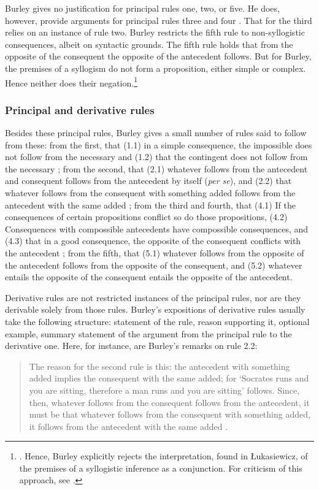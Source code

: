 \documentclass[]{birkjour}
\begin{document}
Burley gives no justification for principal rules one, two, or five. He does, however, provide arguments for principal rules three and four \autocite[p. 63.1-14]{BurleyDPAL}. That for the third relies on an instance of rule two. Burley restricts the fifth rule to non-syllogistic consequences, albeit on syntactic grounds. The fifth rule holds that from the opposite of the consequent the opposite of the antecedent follows. But for Burley, the premises of a syllogism do not form a proposition, either simple or complex. Hence neither does their negation.\footnote{\autocite[pp. 65.3-17; 207.31-208.9]{BurleyDPAL}. Hence, Burley explicitly rejects the interpretation, found in \L{}ukasiewicz, of the premises of a syllogistic inference as a conjunction\autocite{Lukasiewicz1957}. For criticism of this approach, see \autocite{Corcoran1974}.}

\subsubsection{Principal and derivative rules}
Besides these principal rules, Burley gives a small number of rules said to follow from these: from the first, that (1.1) in a simple consequence, the impossible does not follow from the necessary and (1.2) that the contingent does not follow from the necessary \autocite[p. 62.1-8]{BurleyDPAL}; from the second, that (2.1) whatever follows from the antecedent and consequent follows from the antecedent by itself (\textit{per se}), and (2.2) that whatever follows from the consequent with something added follows from the antecedent with the same added \autocite[p. 62.22-38]{BurleyDPAL}; from the third and fourth, that (4.1) If the consequences of certain propositions conflict so do those propositions, (4.2) Consequences with compossible antecedents have compossible consequences, and (4.3) that in a good consequence, the opposite of the consequent conflicts with the antecedent \autocite[pp. 63.15-64.7]{BurleyDPAL}; from the fifth, that (5.1) whatever follows from the opposite of the antecedent follows from the opposite of the consequent, and (5.2) whatever entails the opposite of the consequent entails the opposite of the antecedent.

Derivative rules are not restricted instances of the principal rules, nor are they derivable solely from those rules. Burley's expositions of derivative rules usually take the following structure: statement of the rule, reason supporting it, optional example, summary statement of the argument from the principal rule to the derivative one. Here, for instance, are Burley's remarks on rule 2.2: 
\begin{quote}
	The reason for the second rule is this: the antecedent with something added implies the consequent with the same added; for `Socrates runs and you are sitting, therefore a man runs and you are sitting' follows. Since, then, whatever follows from the consequent follows from the antecedent, it must be that whatever follows from the consequent with something added, it follows from the antecedent with the same added \autocite[p. 62.33-38]{BurleyDPAL}.
\end{quote}
\end{document}
